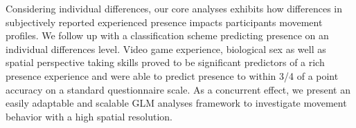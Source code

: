 Considering individual differences, our core analyses exhibits how differences in subjectively reported experienced presence impacts participants movement profiles. We follow up with a classification scheme predicting presence on an individual differences level. Video game experience, biological sex as well as spatial perspective taking skills proved to be significant predictors of a rich presence experience and were able to predict presence to within 3/4 of a point accuracy on a standard questionnaire scale. As a concurrent effect, we present an easily adaptable and scalable GLM analyses framework to investigate movement behavior with a high spatial resolution.